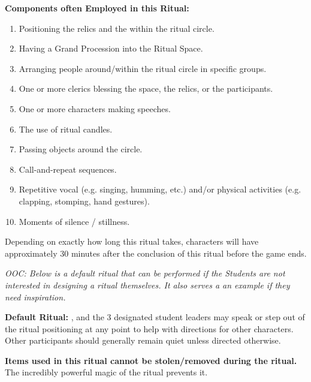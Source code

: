 \documentclass[green]{GL2020}
\begin{document}
\textbf{Components often Employed in this Ritual:}
\begin{enumerate}
  \item Positioning the relics and the \sStormSeed{} within the ritual circle.
  \item Having a Grand Procession into the Ritual Space.
  \item Arranging people around/within the ritual circle in specific groups.
  \item One or more clerics blessing the space, the relics, or the participants.
  \item One or more characters making speeches.
  \item The use of ritual candles.
  \item Passing objects around the circle.
  \item Call-and-repeat sequences.
  \item Repetitive vocal (e.g. singing, humming, etc.) and/or physical activities (e.g. clapping, stomping, hand gestures).
  \item Moments of silence / stillness.
\end{enumerate}

Depending on exactly how long this ritual takes, characters will have approximately 30 minutes after the conclusion of this ritual before the game ends.

\emph{OOC: Below is a default ritual that can be performed if the Students are not interested in designing a ritual themselves. It also serves a an example if they need inspiration.}

\textbf{Default Ritual:}
\cPrincipal{}, \cChupSecond{} and the 3 designated student leaders may speak or step out of the ritual positioning at any point to help with directions for other characters. Other participants should generally remain quiet unless directed otherwise.

\textbf{Items used in this ritual cannot be stolen/removed during the ritual.} The incredibly powerful magic of the ritual prevents it.
\end{document}
